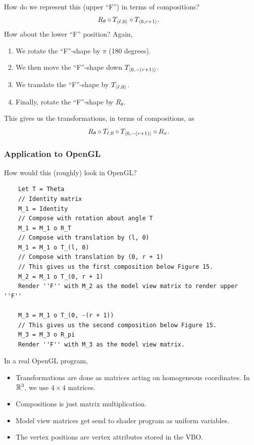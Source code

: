 \documentclass[letterpaper]{article}
\begin{document}
How do we represent this (upper ``F'') in terms of compositions?
\[R_{\theta} \circ T_{\langle \ell, 0 \rangle} \circ T_{\langle 0, r + 1 \rangle}.\]
How about the lower ``F'' position? Again, 
\begin{enumerate}
    \item We rotate the ``F''-shape by $\pi$ (180 degrees).
    \item We then move the ``F''-shape down $T_{\langle 0, -(r + 1) \rangle}$. 
    \item We translate the ``F''-shape by $T_{\langle \ell, 0 \rangle}$.
    \item Finally, rotate the ``F''-shape by $R_{\theta}$.
\end{enumerate}
This gives us the transformations, in terms of compositions, as 
\[R_{\theta} \circ T_{\ell, 0} \circ T_{\langle 0, -(r + 1) \rangle} \circ R_{\pi}.\]

\subsubsection{Application to OpenGL}
How would this (roughly) look in OpenGL?
\begin{verbatim}
    Let T = Theta 
    // Identity matrix 
    M_1 = Identity 
    // Compose with rotation about angle T
    M_1 = M_1 o R_T
    // Compose with translation by (l, 0)
    M_1 = M_1 o T_(l, 0)
    // Compose with translation by (0, r + 1)
    // This gives us the first composition below Figure 15. 
    M_2 = M_1 o T_(0, r + 1)
    Render ''F'' with M_2 as the model view matrix to render upper ''F''

    M_3 = M_1 o T_(0, -(r + 1))
    // This gives us the second composition below Figure 15. 
    M_3 = M_3 o R_pi 
    Render ''F'' with M_3 as the model view matrix. 
\end{verbatim}
In a real OpenGL program,
\begin{itemize}
    \item Transformations are done as matrices acting on homogeneous coordinates. In $\mathbb{R}^3$, we use $4 \times 4$ matrices. 
    \item Compositions is just matrix multiplication. 
    \item Model view matrices get send to shader program as uniform variables. 
    \item The vertex positions are vertex attributes stored in the VBO. 
\end{itemize}
\end{document}
